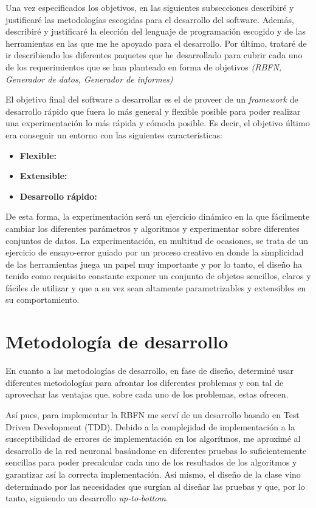 \documentclass[10pt,a4paper]{report}
\begin{document}
Una vez especificados los objetivos, en las siguientes subsecciones describiré y justificaré las metodologías escogidas para el desarrollo del software. Además, describiré y justificaré la elección del lenguaje de programación escogido y de las herramientas en las que me he apoyado para el desarrollo. Por último, trataré de ir describiendo los diferentes paquetes que he desarrollado para cubrir cada uno de los requerimientos que se han planteado en forma de objetivos \textit{(RBFN, Generador de datos, Generador de informes)}

El objetivo final del software a desarrollar es el de proveer de un \textit{framework} de desarrollo rápido que fuera lo más general y flexible posible para poder realizar una experimentación lo más rápida y cómoda posible. Es decir, el objetivo último era conseguir un entorno con las siguientes características:
\begin{itemize}
	\item \textbf{Flexible:} 
	\item \textbf{Extensible:}
	\item \textbf{Desarrollo rápido:}
\end{itemize}

De esta forma, la experimentación será un ejercicio dinámico en la que fácilmente cambiar los diferentes parámetros y algoritmos y experimentar sobre diferentes conjuntos de datos. La experimentación, en multitud de ocasiones, se trata de un ejercicio de ensayo-error guiado por un proceso creativo en donde la simplicidad de las herramientas juega un papel muy importante y por lo tanto, el diseño ha tenido como requisito constante exponer un conjunto de objetos sencillos, claros y fáciles de utilizar y que a su vez sean altamente parametrizables y extensibles en su comportamiento.


\section{Metodología de desarrollo}
En cuanto a las metodologías de desarrollo, en fase de diseño, determiné usar diferentes metodologías para afrontar los diferentes problemas y con tal de aprovechar las ventajas que, sobre cada uno de los problemas, estas ofrecen.

Así pues, para implementar la RBFN me serví de un desarrollo basado en Test Driven Development (TDD). Debido a la complejidad de implementación a la susceptibilidad de errores de implementación en los algorítmos, me aproximé al desarrollo de la red neuronal basándome en diferentes pruebas lo suficientemente sencillas para poder precalcular cada uno de los resultados de los algoritmos y garantizar así la correcta implementación. Así mismo, el diseño de la clase vino determinado por las necesidades que surgían al diseñar las pruebas y que, por lo tanto, siguiendo un desarrollo \textit{up-to-bottom}.
\end{document}
